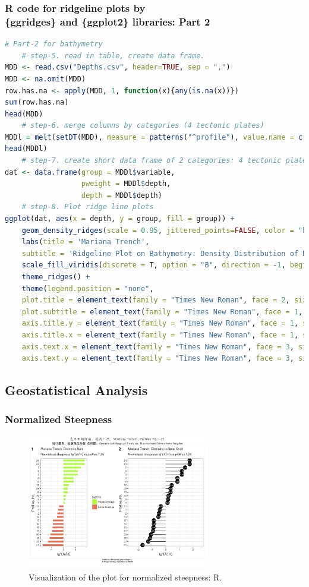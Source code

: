 \documentclass[pdflatex,compress,10pt,
	xcolor={dvipsnames,dvipsnames,svgnames,x11names,table},
	hyperref={colorlinks = true,breaklinks = true, urlcolor = NavyBlue, breaklinks = true}]{beamer}
\begin{document}
\begin{frame}[fragile,shrink=20]\frametitle{R code for ridgeline plots by\\ \{ggridges\} and \{ggplot2\} libraries: Part 2}
\begin{lstlisting}[language=R]
# Part-2 for bathymetry
	# step-5. read in table, create data frame.
MDD <- read.csv("Depths.csv", header=TRUE, sep = ",")
MDD <- na.omit(MDD) 
row.has.na <- apply(MDD, 1, function(x){any(is.na(x))}) 
sum(row.has.na) 
head(MDD)
	# step-6. merge columns by categories (4 tectonic plates)
MDDl = melt(setDT(MDD), measure = patterns("^profile"), value.name = c("depth"))
head(MDDl)
	# step-7. create short data frame of 2 categories: 4 tectonic plates and bathymetry
dat <- data.frame(group = MDDl$variable,
                  pweight = MDDl$depth,
                  depth = MDDl$depth)
 	# step-8. Plot ridge line plots
ggplot(dat, aes(x = depth, y = group, fill = group)) +
	geom_density_ridges(scale = 0.95, jittered_points=FALSE, color = "blue", size = 0.2) +
	labs(title = 'Mariana Trench',
	subtitle = 'Ridgeline Plot on Bathymetry: Density Distribution of Depth Observation Points') +
	scale_fill_viridis(discrete = T, option = "B", direction = -1, begin = .1, end = .9) +
	theme_ridges() +
	theme(legend.position = "none",
	plot.title = element_text(family = "Times New Roman", face = 2, size = 12),
	plot.subtitle = element_text(family = "Times New Roman", face = 1, size = 12),
	axis.title.y = element_text(family = "Times New Roman", face = 1, size = 12),
	axis.title.x = element_text(family = "Times New Roman", face = 1, size = 12),
	axis.text.x = element_text(family = "Times New Roman", face = 3, size = 10),
	axis.text.y = element_text(family = "Times New Roman", face = 3, size = 10))
\end{lstlisting}
\end{frame}

\subsection{Geostatistical Analysis}

\begin{frame}\frametitle{Normalized Steepness}
\begin{figure}[H]
	\centering
		\includegraphics[width=8cm]{Fig-3-1.jpg}\caption{Visualization of the plot for normalized steepness: R.}
\end{figure}		
\end{frame}
\end{document}
